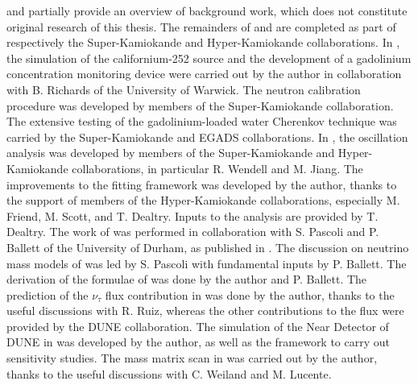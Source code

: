  and partially  provide an overview of background work, %
which does not constitute original research of this thesis.
The remainders of  and  are completed %
as part of respectively the Super-Kamiokande and Hyper-Kamiokande collaborations.
In , the simulation of the californium-252 source and the development %
of a gadolinium concentration monitoring device were carried out by the author in collaboration with %
B. Richards of the University of Warwick.
The neutron calibration procedure was developed by members of the Super-Kamiokande collaboration. 
The extensive testing of the gadolinium-loaded water Cherenkov technique was carried by the Super-Kamiokande and EGADS collaborations.
In , the oscillation analysis was developed by members of the Super-Kamiokande and Hyper-Kamiokande collaborations, %
in particular R. Wendell and M. Jiang.
The improvements to the fitting framework was developed by the author, thanks to the support of members of the Hyper-Kamiokande collaborations, %
especially M. Friend, M. Scott, and T. Dealtry.
Inputs to the analysis are provided by T. Dealtry.
The work of  was performed in collaboration with %
S. Pascoli and P. Ballett of the University of Durham, as published in .
The discussion on neutrino mass models of  was led by S. Pascoli with %
fundamental inputs by P. Ballett.
The derivation of the formulae of  was done by the author and P. Ballett.
The prediction of the $\nu_\tau$ flux contribution in  was done by the author, %
thanks to the useful discussions with R. Ruiz, %
whereas the other contributions to the flux were provided by the DUNE collaboration.
The simulation of the Near Detector of DUNE in  was developed by the author, %
as well as the framework to carry out sensitivity studies.
The mass matrix scan in  was carried out by the author, thanks to the %
useful discussions with C. Weiland and M. Lucente.
